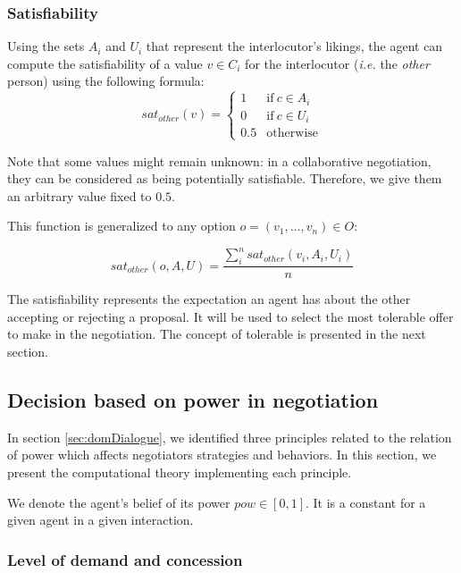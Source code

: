 \documentclass{llncs}
\begin{document}
	\subsubsection*{Satisfiability}
	Using the sets $A_i$ and $U_i$ that represent the interlocutor's likings, the agent can compute the satisfiability of a value $v\in C_i$ for the interlocutor (\emph{i.e.} the \emph{other} person) using the following formula:
	\vspace{-0.5em} 
	\begin{equation}
	sat_{other}(v)= \left\{\begin{array}{ll}
	1	 & \mathrm{if\ }  c \in A_i\\
	0    & \mathrm{if\ }c \in U_i\\
	0.5	 & \mathrm{otherwise}
	\end{array}\right.
	\end{equation}
	
	Note that some values might remain unknown: in a collaborative negotiation, they can be considered as being potentially satisfiable. Therefore, we give them an arbitrary value fixed to $0.5$.
	
	This function is generalized to any option $o=(v_1,\ldots,v_n) \in O$:
	
	\begin{equation}
	sat_{other}(o, A, U) = \frac{ \sum_{i}^{n} sat_{other}(v_i, A_i, U_i) } {n}
	\end{equation}
	
	The satisfiability represents the expectation an agent has about the other accepting or rejecting a proposal. It will be used to select the most tolerable offer to make in the negotiation. The concept of tolerable is presented in the next section.
	
	\subsection{Decision based on power in negotiation}
	\label{sec:decision}
	
	In section \ref{sec:domDialogue}, we identified three principles related to the relation of power which affects negotiators strategies and behaviors. In this section, we present the computational theory implementing each principle. 
	
	We denote the agent's belief of its  power $pow \in [0, 1]$. It is a constant for a given agent in a given interaction.
	
	
	\subsubsection{Level of demand and concession}
	
\end{document}
